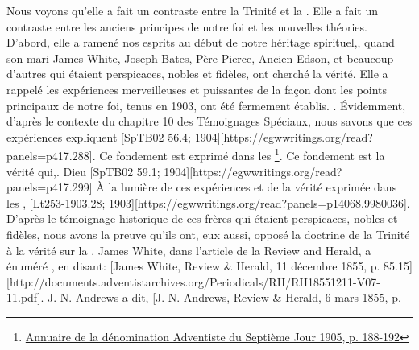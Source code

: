 Nous voyons qu'elle a fait un contraste entre la Trinité et la . Elle a fait un contraste entre les anciens principes de notre foi et les nouvelles théories. D'abord, elle a ramené nos esprits au début de notre héritage spirituel,, quand son mari James White, Joseph Bates, Père Pierce, Ancien Edson, et beaucoup d'autres qui étaient perspicaces, nobles et fidèles, ont cherché la vérité. Elle a rappelé les expériences merveilleuses et puissantes de la façon dont les points principaux de notre foi, tenus en 1903, ont été fermement établis.   . Évidemment, d'après le contexte du chapitre 10 des Témoignages Spéciaux, nous savons que ces expériences expliquent [SpTB02 56.4; 1904][https://egwwritings.org/read?panels=p417.288]. Ce fondement est exprimé dans les \footnote{\href{https://static1.squarespace.com/static/554c4998e4b04e89ea0c4073/t/59d17e24c027d84167e17617/1506901547915/SDA-YB1905+\%28P.+188-192\%29.pdf}{Annuaire de la dénomination Adventiste du Septième Jour 1905, p. 188-192}}. Ce fondement est la vérité qui,. Dieu [SpTB02 59.1; 1904][https://egwwritings.org/read?panels=p417.299] À la lumière de ces expériences et de la vérité exprimée dans les , [Lt253-1903.28; 1903][https://egwwritings.org/read?panels=p14068.9980036]. D'après le témoignage historique de ces frères qui étaient perspicaces, nobles et fidèles, nous avons la preuve qu'ils ont, eux aussi, opposé la doctrine de la Trinité à la vérité sur la . James White, dans l'article de la Review and Herald, a énuméré , en disant: [James White, Review \& Herald, 11 décembre 1855, p. 85.15][http://documents.adventistarchives.org/Periodicals/RH/RH18551211-V07-11.pdf]. J. N. Andrews a dit, [J. N. Andrews, Review \& Herald, 6 mars 1855, p. 